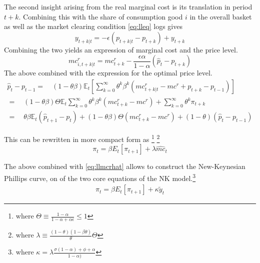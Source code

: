 \documentclass[12pt,a4paper,english]{article} %
\newcommand{\E}{\mathbb{E}} %
\begin{document}
	The second insight arising from the real marginal cost is its translation in period $t+k$. Combining this with the share of consumption good $i$ in the overall basket as well as the market clearing condition \eqref{eq:lleq} logs gives 
	\begin{equation}
		y_{t+k|t} = -\epsilon(p_{t+k|t} - p_{t+k}) + y_{t+k}
	\end{equation}
	Combining the two yields an expression of marginal cost and the price level.
	\begin{equation}
		mc_{i, t+k|t}^r = mc_{t+k}^r - \frac{\epsilon \alpha}{1 - \alpha}(\hat{p}_t - p_{t+k})
	\end{equation}
	The above combined with the expression for the optimal price level.
	\begin{equation}
		\begin{aligned}
			\hat{p}_t - p_{t-1} =
			\quad
			(1 - \theta \beta) \E_t
			\left[
			\sum_{k=0}^{\infty} \theta^k \beta^k \left( mc_{t+k|t}^r - mc^r +p_{t+k} - p_{t-1}\right)
			\right] \\			
			=
			\quad
			(1 - \theta \beta) \Theta \E_t
			\sum_{k=0}^{\infty} \theta^k \beta^k (mc_{t+k}^r - mc^r) + 
			\sum_{k=0}^{\infty} \theta^k \pi_{t+k} \\
			=
			\quad
			\theta \beta \E_t (\hat{p}_{t+1} - p_{t}) + (1 - \theta \beta) \Theta (mc_{t+k}^r - mc^r) + (1 - \theta) (\hat{p}_t - p_{t-1})
		\end{aligned}		
	\end{equation} 

	This can be rewritten in more compact form as \footnote{where $\Theta \equiv \frac{1 - \alpha}{1 - \alpha + \alpha \epsilon} \leq 1$} \footnote{	where $\lambda \equiv \frac{(1-\theta)(1-\beta\theta)}{\theta} \Theta$}
	\begin{equation}
		\pi_t = \beta E_t [\pi_{t+1}] + \lambda \hat{mc}_{t}
	\end{equation}

	The above combined with \eqref{eq:llmcrhat} allows to construct the New-Keynesian Phillips curve, on of the two core equations of the NK model.\footnote{where $\kappa = \lambda \frac{\sigma (1 - \alpha) + \phi + \alpha}{1 - \alpha)}$}
	\begin{equation} \label{eq:llnkp}
		\begin{aligned}
			\pi_t = \beta E_t [\pi_{t+1}] + \kappa \tilde{y}_t
		\end{aligned}
	\end{equation}
	
\end{document}

